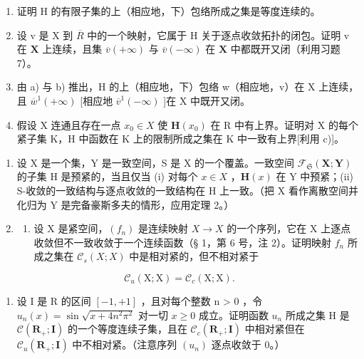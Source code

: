 \begin{enumerate}
\def\labelenumi{\alph{enumi})}
\item
  证明 H 的有限子集的上（相应地，下）包络所成之集是等度连续的。
\item
  设 v 是 X 到 \(\overline{R}\) 中的一个映射，它属于 H 关于逐点收敛拓扑的闭包。证明 v 在 \(\mathbf{X}\) 上连续，且集 \(\overline{v} (+\infty)\) 与 \(\overline{v} (-\infty)\) 在 \(\mathbf{X}\) 中都既开又闭（利用习题 7）。
\item
  由 a) 与 b) 推出，H 的上（相应地，下）包络 w（相应地，v）在 X 上连续，且 \(\overline{w}^{1}(+\infty)\) {[}相应地 \(\overline{v}^{1}(-\infty)\) {]}在 X 中既开又闭。
\item
  假设 X 连通且存在一点 \(x_{0} \in X\) 使 \(\mathbf{H}(x_{0})\) 在 R 中有上界。证明对 X 的每个紧子集 K，H 中函数在 K 上的限制所成之集在 K 中一致有上界{[}利用 c){]}。
\end{enumerate}

\begin{enumerate}
\def\labelenumi{\arabic{enumi})}
\setcounter{enumi}{8}
\item
  设 X 是一个集，Y 是一致空间，S 是 X 的一个覆盖。一致空间 \(\mathcal{F}_{\mathfrak{S}}(\mathbf{X};\mathbf{Y})\) 的子集 H 是预紧的，当且仅当 (i) 对每个 \(x\in X\) ，\(\mathbf{H}(x)\) 在 Y 中预紧；(ii) S-收敛的一致结构与逐点收敛的一致结构在 H 上一致。（把 X 看作离散空间并化归为 Y 是完备豪斯多夫的情形，应用定理 2。）
\item
  \begin{enumerate}
  \def\labelenumii{\alph{enumii})}
  \tightlist
  \item
    设 X 是紧空间，\((f_{n})\) 是连续映射 \(X \rightarrow X\) 的一个序列，它在 X 上逐点收敛但不一致收敛于一个连续函数（§ 1，第 6 号，注 2）。证明映射 \(f_{n}\) 所成之集在 \(\mathcal{C}_{s}(X; X)\) 中是相对紧的，但不相对紧于
  \end{enumerate}
\end{enumerate}

\[
\mathcal {C} _ {u} (\mathrm{X}; \mathrm{X}) = \mathcal {C} _ {c} (\mathrm{X}; \mathrm{X}).
\]

\begin{enumerate}
\def\labelenumi{\alph{enumi})}
\setcounter{enumi}{1}
\tightlist
\item
  设 I 是 R 的区间 \([-1, +1]\) ，且对每个整数 n \textgreater{} 0 ，令 \(u_{n}(x) = \sin \sqrt{x + 4n^{2}\pi^{2}}\) 对一切 \(x \geqslant 0\) 成立。证明函数 \(u_{n}\) 所成之集 H 是 \(\mathcal{C}(\mathbf{R}_{+}; \mathbf{I})\) 的一个等度连续子集，且在 \(\mathcal{C}_{c}(\mathbf{R}_{+}; \mathbf{I})\) 中相对紧但在 \(\mathcal{C}_{u}(\mathbf{R}_{+}; \mathbf{I})\) 中不相对紧。（注意序列 \((u_{n})\) 逐点收敛于 0。）
\end{enumerate}

